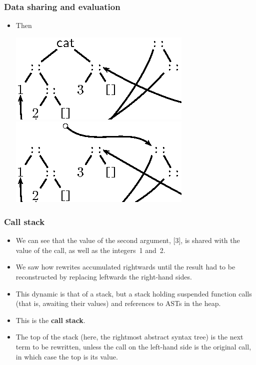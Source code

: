 \documentclass[compress,dvips,xcolor={dvipsnames},t]{beamer}
\begin{document}
\begin{frame}
  \frametitle{Data sharing and evaluation}

  \begin{itemize}

    \item Then
  \begin{center}
    \includegraphics{cat123_pop1}
    \qquad\quad
    \includegraphics{cat123_pop2}
  \end{center}
  \end{itemize}

\end{frame}

\begin{frame}
  \frametitle{Call stack}

  \begin{itemize}

    \item We can see that the value of the second argument, [3], is
      shared with the value of the call, as well as the integers~1
      and~2.

    \item We saw how rewrites accumulated rightwards until the result
      had to be reconstructed by replacing leftwards the right-hand
      sides.

    \item This dynamic is that of a stack, but a stack holding
      suspended function calls (that is, awaiting their values) and
      references to ASTs in the heap.

    \item This is the \textbf{call stack}.

    \item The top of the stack (here, the rightmost abstract syntax
      tree) is the next term to be rewritten, unless the call on the
      left\hyp{}hand side is the original call, in which case the top
      is its value.

  \end{itemize}

\end{frame}
\end{document}
